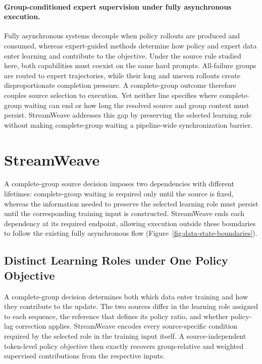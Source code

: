 \documentclass[letterpaper]{article}
\begin{document}
\paragraph{Group-conditioned expert supervision under fully asynchronous execution.}
Fully asynchronous systems decouple when policy rollouts are produced and consumed, whereas expert-guided methods determine how policy and expert data enter learning and contribute to the objective.
Under the source rule studied here, both capabilities must coexist on the same hard prompts.
All-failure groups are routed to expert trajectories, while their long and uneven rollouts create disproportionate completion pressure.
A complete-group outcome therefore couples source selection to execution.
Yet neither line specifies where complete-group waiting can end or how long the resolved source and group context must persist.
StreamWeave addresses this gap by preserving the selected learning role without making complete-group waiting a pipeline-wide synchronization barrier.

\section{StreamWeave}
\label{sec:method}

A complete-group source decision imposes two dependencies with different lifetimes: complete-group waiting is required only until the source is fixed, whereas the information needed to preserve the selected learning role must persist until the corresponding training input is constructed.
StreamWeave ends each dependency at its required endpoint, allowing execution outside these boundaries to follow the existing fully asynchronous flow (Figure~\ref{fig:data-state-boundaries}).

\subsection{Distinct Learning Roles under One Policy Objective}
\label{sec:learning-composition}

A complete-group decision determines both which data enter training and how they contribute to the update.
The two sources differ in the learning role assigned to each sequence, the reference that defines its policy ratio, and whether policy-lag correction applies.
StreamWeave encodes every source-specific condition required by the selected role in the training input itself.
A source-independent token-level policy objective then exactly recovers group-relative and weighted supervised contributions from the respective inputs.
\end{document}
